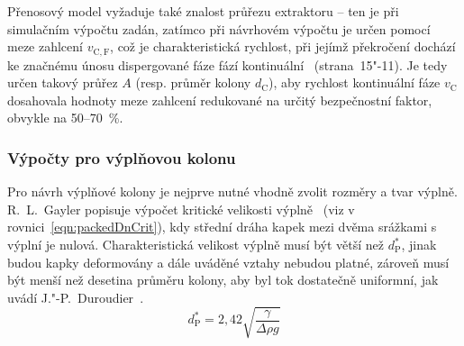 Přenosový model vyžaduje také znalost průřezu extraktoru -- ten je při simulačním výpočtu zadán, zatímco při návrhovém výpočtu je určen pomocí meze zahlcení $v_\mathrm{C,F}$, což je charakteristická rychlost, při jejímž překročení dochází ke značnému únosu dispergované fáze fází kontinuální~\cite{Perry_15} (strana~15"-11).
Je tedy určen takový průřez $A$ (resp. průměr kolony $d_\mathrm{C}$), aby rychlost kontinuální fáze $v_\mathrm{C}$ dosahovala hodnoty meze zahlcení redukované na určitý bezpečnostní faktor, obvykle na 50--70~\%.



\subsubsection{Výpočty pro výplňovou kolonu} \label{insfunPacked}
Pro návrh výplňové kolony je nejprve nutné vhodně zvolit rozměry a tvar výplně.
R.~L.~Gayler popisuje výpočet kritické velikosti výplně~\cite{Gayler1953} (viz v rovnici~\ref{eqn:packedDnCrit}), kdy střední dráha kapek mezi dvěma srážkami s výplní je nulová.
Charakteristická velikost výplně musí být větší než $d_\mathrm{P}^*$, jinak budou kapky deformovány a dále uváděné vztahy nebudou platné, zároveň musí být menší než desetina průměru kolony, aby byl tok dostatečně uniformní, jak uvádí J."-P.~Duroudier~\cite{Duroudier2016}.
\begin{equation}
\label{eqn:packedDnCrit}
	d_\mathrm{P}^* = 2,42 \sqrt{\frac{\gamma}{\Delta\rho g}}
\end{equation}

